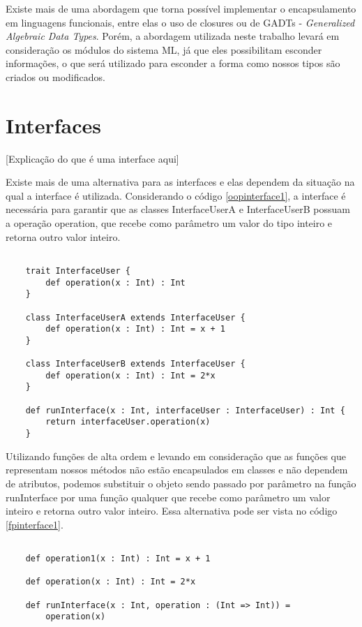Existe mais de uma abordagem que torna 
possível implementar o encapsulamento em 
linguagens funcionais, entre elas o uso 
de closures\cite{classlessjs} ou de 
GADTs - \textit{Generalized Algebraic 
Data Types}\cite{existentialhaskell}. 
Porém, a abordagem utilizada neste 
trabalho levará em consideração os 
módulos do sistema ML, já que eles 
possibilitam esconder informações, 
o que será utilizado para esconder a 
forma como nossos tipos são criados 
ou modificados\cite{mlmodules}.


\section{Interfaces}

[Explicação do que é uma interface aqui]

Existe mais de uma alternativa para as interfaces 
e elas dependem da situação na qual a interface é 
utilizada. Considerando o código \ref{oopinterface1}, 
a interface é necessária para garantir que as 
classes InterfaceUserA e InterfaceUserB possuam 
a operação operation, que recebe como parâmetro 
um valor do tipo inteiro e retorna outro valor 
inteiro.


\begin{lstlisting}[caption={Interfaces em Orientação a Objetos},label=oopinterface1]
    
    trait InterfaceUser {
        def operation(x : Int) : Int
    }

    class InterfaceUserA extends InterfaceUser {
        def operation(x : Int) : Int = x + 1
    }

    class InterfaceUserB extends InterfaceUser {
        def operation(x : Int) : Int = 2*x
    }

    def runInterface(x : Int, interfaceUser : InterfaceUser) : Int {
        return interfaceUser.operation(x)
    }

\end{lstlisting}

Utilizando funções de alta ordem e levando em 
consideração que as funções que representam nossos 
métodos não estão encapsulados em classes e 
não dependem de atributos, podemos substituir o 
objeto sendo passado por parâmetro na função 
runInterface por uma função qualquer que recebe 
como parâmetro um valor inteiro e retorna outro 
valor inteiro. Essa alternativa pode ser vista 
no código \ref{fpinterface1}.

\begin{lstlisting}[caption={Interfaces em Programação Funcional},label=fpinterface1]
    
    def operation1(x : Int) : Int = x + 1

    def operation(x : Int) : Int = 2*x

    def runInterface(x : Int, operation : (Int => Int)) =
        operation(x)
    
\end{lstlisting}


